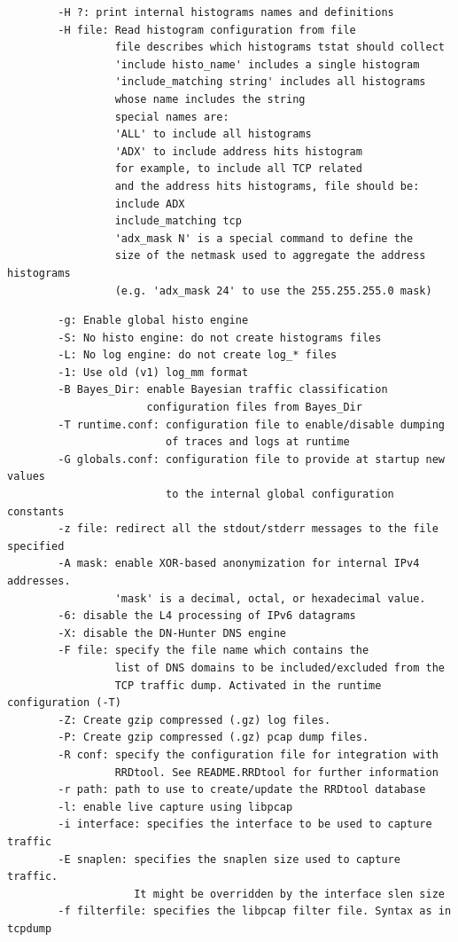 \documentclass[11pt]{article}
\begin{document}
\begin{small}\begin{verbatim}
        -H ?: print internal histograms names and definitions
        -H file: Read histogram configuration from file
                 file describes which histograms tstat should collect
                 'include histo_name' includes a single histogram
                 'include_matching string' includes all histograms
                 whose name includes the string
                 special names are:
                 'ALL' to include all histograms
                 'ADX' to include address hits histogram
                 for example, to include all TCP related
                 and the address hits histograms, file should be:
                 include ADX
                 include_matching tcp
                 'adx_mask N' is a special command to define the 
                 size of the netmask used to aggregate the address histograms
                 (e.g. 'adx_mask 24' to use the 255.255.255.0 mask)
\end{verbatim}\end{small} \noindent
\begin{small}\begin{verbatim}
        -g: Enable global histo engine
        -S: No histo engine: do not create histograms files 
        -L: No log engine: do not create log_* files 
        -1: Use old (v1) log_mm format
        -B Bayes_Dir: enable Bayesian traffic classification
                      configuration files from Bayes_Dir
        -T runtime.conf: configuration file to enable/disable dumping
                         of traces and logs at runtime
        -G globals.conf: configuration file to provide at startup new values
                         to the internal global configuration constants     
        -z file: redirect all the stdout/stderr messages to the file specified
        -A mask: enable XOR-based anonymization for internal IPv4 addresses.
                 'mask' is a decimal, octal, or hexadecimal value.
        -6: disable the L4 processing of IPv6 datagrams                          
        -X: disable the DN-Hunter DNS engine 
        -F file: specify the file name which contains the
                 list of DNS domains to be included/excluded from the
                 TCP traffic dump. Activated in the runtime configuration (-T)
        -Z: Create gzip compressed (.gz) log files.
        -P: Create gzip compressed (.gz) pcap dump files.
        -R conf: specify the configuration file for integration with
                 RRDtool. See README.RRDtool for further information
        -r path: path to use to create/update the RRDtool database
        -l: enable live capture using libpcap
        -i interface: specifies the interface to be used to capture traffic
        -E snaplen: specifies the snaplen size used to capture traffic.
                    It might be overridden by the interface slen size
        -f filterfile: specifies the libpcap filter file. Syntax as in tcpdump
\end{verbatim}\end{small} \noindent
\end{document}
